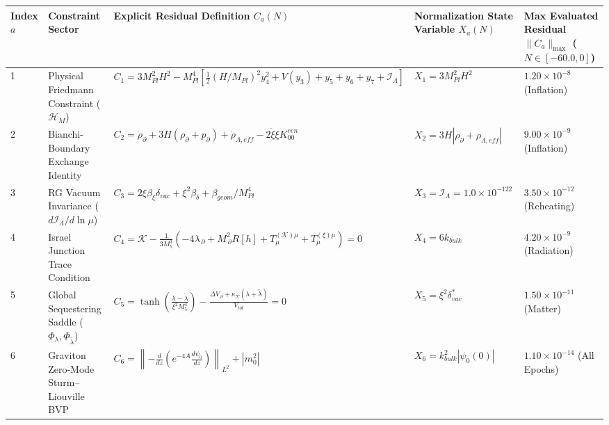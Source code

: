 \documentclass[aps,prd,onecolumn,superscriptaddress,nofootinbib,longbibliography,10pt]{revtex4-2}
\begin{document}
  
\begin{center}
\begin{tabular}{|lllll|}
\hline

      Index \(a\) & Constraint Sector & Explicit Residual Definition \(C_a(N)\) & Normalization State Variable \(X_a(N)\) & Max Evaluated Residual \(\|C_a\|_{\max}\) (\(N\in[-60.0,0]\))
       \\ \hline

    
    
      1 & Physical Friedmann Constraint (\(\mathcal{H}_M\)) & \(C_1 = 3M_{Pl}^2 H^2 - M_{Pl}^4 \left[ \frac{1}{2}(H/M_{Pl})^2 y_4^2 + V(y_3) + y_5 + y_6 + y_7 + \mathcal{I}_{\Lambda} \right]\) & \(X_1 = 3M_{Pl}^2 H^2\) & \(1.20 \times 10^{-8}\) (Inflation) \\ \hline

      2 & Bianchi-Boundary Exchange Identity & \(C_2 = \dot{\rho}_\partial + 3H(\rho_\partial + p_\partial) + \dot{\rho}_{\Lambda,eff} - 2\dot{\xi}\xi K_{00}^{ren}\) & \(X_2 = 3H|\rho_\partial + \rho_{\Lambda,eff}|\) & \(9.00 \times 10^{-9}\) (Inflation) \\ \hline

      3 & RG Vacuum Invariance (\(d\mathcal{I}_\Lambda/d\ln\mu\)) & \(C_3 = 2\xi\beta_\xi\delta_{vac} + \xi^2\beta_\delta + \beta_{geom}/M_{Pl}^4\) & \(X_3 = \mathcal{I}_\Lambda = 1.0 \times {10^{-122}}\) & \(3.50 \times 10^{-12}\) (Reheating) \\ \hline

      4 & Israel Junction Trace Condition & \(\displaystyle C_{4} = \mathcal{K} - \frac{1}{3M_{5}^{3}}\left(-4\lambda_{\,\partial} + M_{\,\partial}^{2}R[h] + T_{\mu}^{(\mathcal{K})\mu} + T_{\mu}^{(\xi)\mu}\right) = 0\) & \(X_4 = 6k_{bulk}\) & \(4.20 \times 10^{-9}\) (Radiation) \\ \hline

      5 & Global Sequestering Saddle (\(\Phi_\lambda, \Phi_{\tilde{\lambda}}\)) & \(\displaystyle C_{5} = \tanh\!\left(\frac{\lambda - \tilde{\lambda}}{\xi^{2}M_{5}^{4}}\right) - \frac{\Delta V_{\,\partial} + \kappa_{\Sigma}(\lambda + \tilde{\lambda})}{V_{tot}} = 0\) & \(X_5 = \xi^2\delta_{vac}^*\) & \(1.50 \times 10^{-11}\) (Matter) \\ \hline

      6 & Graviton Zero-Mode Sturm–Liouville BVP & \(C_6 = \left\| -\frac{d}{dz}\left(e^{-4A}\frac{d\psi_0}{dz}\right) \right\|_{L^2} + |m_0^2|\) & \(X_6 = k_{bulk}^2|\psi_0(0)|\) & \(1.10 \times 10^{-14}\) (All Epochs) \\ \hline


\end{tabular}
\end{center}
\end{document}
